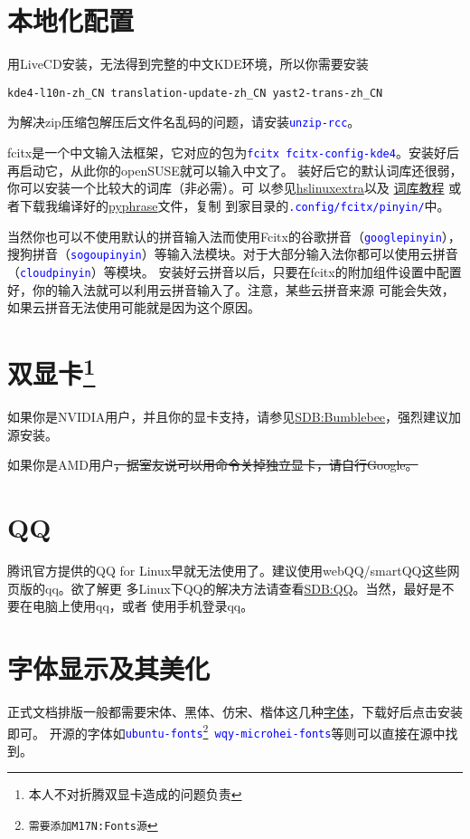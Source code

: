 \documentclass[11pt]{article}
\newcommand{\command}[1]{\texttt{\textcolor{blue}{#1}}}
\newcommand{\soft}[1]{\texttt{\textcolor{blue}{#1}}}
\begin{document}
\section{本地化配置}
用LiveCD安装，无法得到完整的中文KDE环境，所以你需要安装
\begin{Verbatim}[formatcom=\color{codecolor}]
    kde4-l10n-zh_CN translation-update-zh_CN yast2-trans-zh_CN
\end{Verbatim}

为解决zip压缩包解压后文件名乱码的问题，请安装\soft{unzip-rcc}。

fcitx是一个中文输入法框架，它对应的包为\soft{fcitx fcitx-config-kde4}。安装好后再启动它，从此你的openSUSE就可以输入中文了。
装好后它的默认词库还很弱，你可以安装一个比较大的词库（非必需）。可%
以参见\href{https://code.google.com/p/hslinuxextra/}{hs\-linux\-extra}以及%
\href{https://www.librehat.com/fcitx-sogou-pinyin-cell-database-convert-import-guide/}{词库教程}%
或者下载我编译好的\href{http://pan.baidu.com/s/1i3HtJ4T}{pyphrase}文件，复制
到家目录的\command{.config/fcitx/pinyin/}中。

当然你也可以不使用默认的拼音输入法而使用Fcitx的谷歌拼音（\soft{goo\-gle\-pin\-yin}），
搜狗拼音（\soft{so\-gou\-pin\-yin}）等输入法模块。对于大部分输入法你都可以使用云拼音（\soft{cloud\-pin\-yin}）等模块。
安装好云拼音以后，只要在fcitx的附加组件设置中配置好，你的输入法就可以利用云拼音输入了。注意，某些云拼音来源
可能会失效，如果云拼音无法使用可能就是因为这个原因。
\section[双显卡]{双显卡\protect\footnote{本人不对折腾双显卡造成的问题负责}}
如果你是NVIDIA用户，并且你的显卡支持，请参见\href{https://zh.opensuse.org/SDB:Bumblebee}{SDB:Bumblebee}，强烈建议加源安装。

如果你是AMD用户\sout{，据室友说可以用命令关掉独立显卡，请自行Google。}
\section{QQ}
腾讯官方提供的QQ for Linux早就无法使用了。建议使用webQQ/smartQQ这些网页版的qq。欲了解更
多Linux下QQ的解决方法请查看\href{https://zh.opensuse.org/SDB:QQ}{SDB:QQ}。当然，最好是不要在电脑上使用qq，或者
使用手机登录qq。
\section{字体显示及其美化}
正式文档排版一般都需要宋体、黑体、仿宋、楷体这几种\href{http://pan.baidu.com/s/1mgiHWmO}{字体}，下载好后点击安装即可。
开源的字体如\soft{ubuntu-fonts\footnote{需要添加M17N:Fonts源} wqy-microhei-fonts}等则可以直接在源中找到。
\end{document}
